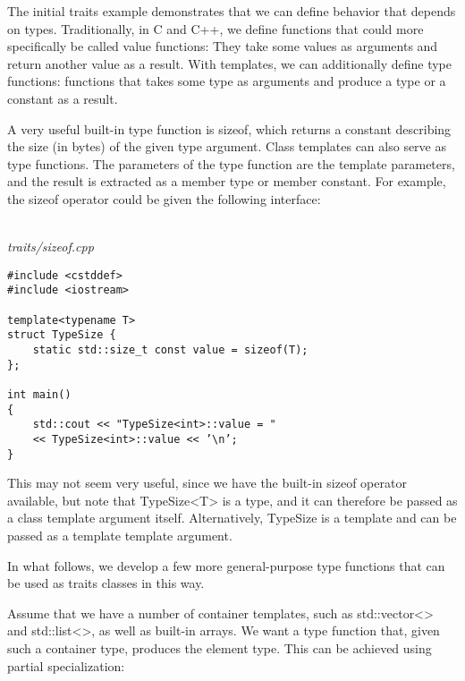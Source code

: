 
The initial traits example demonstrates that we can define behavior that depends on types. Traditionally, in C and C++, we define functions that could more specifically be called value functions: They take some values as arguments and return another value as a result. With templates, we can additionally define type functions: functions that takes some type as arguments and produce a type or a constant as a result.

A very useful built-in type function is sizeof, which returns a constant describing the size (in bytes) of the given type argument. Class templates can also serve as type functions. The parameters of the type function are the template parameters, and the result is extracted as a member type or member constant. For example, the sizeof operator could be given the following interface:

\hspace*{\fill} \\ %
\noindent
\textit{traits/sizeof.cpp}
\begin{lstlisting}[style=styleCXX]
#include <cstddef>
#include <iostream>

template<typename T>
struct TypeSize {
	static std::size_t const value = sizeof(T);
};

int main()
{
	std::cout << "TypeSize<int>::value = "
	<< TypeSize<int>::value << ’\n’;
}
\end{lstlisting}

This may not seem very useful, since we have the built-in sizeof operator available, but note that TypeSize<T> is a type, and it can therefore be passed as a class template argument itself. Alternatively, TypeSize is a template and can be passed as a template template argument.

In what follows, we develop a few more general-purpose type functions that can be used as traits classes in this way.


Assume that we have a number of container templates, such as std::vector<> and std::list<>, as well as built-in arrays. We want a type function that, given such a container type, produces the element type. This can be achieved using partial specialization:


